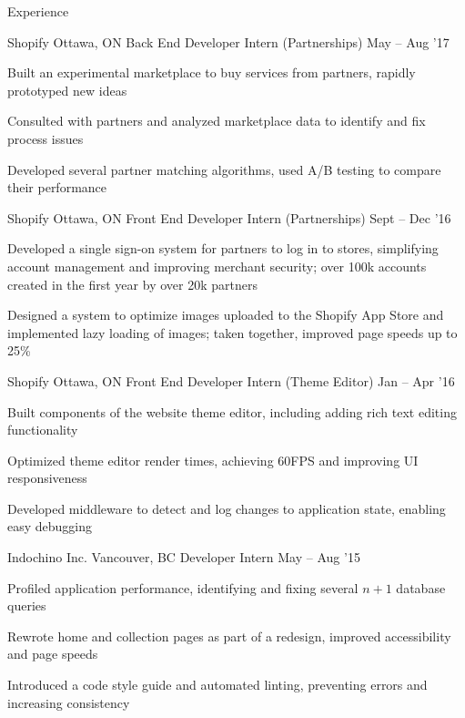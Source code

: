 \documentclass{resume} %
\begin{document}
\begin{rSection}{Experience}
  \begin{rSubsection}{Shopify}
                     {Ottawa, ON}
                     {Back End Developer Intern (Partnerships)}
                     {May -- Aug '17}
    \item Built an experimental marketplace to buy services from partners, rapidly prototyped new ideas
    \item Consulted with partners and analyzed marketplace data to identify and fix process issues
    \item Developed several partner matching algorithms, used A/B testing to compare their performance
  \end{rSubsection}

  \begin{rSubsection}{Shopify}
                     {Ottawa, ON}
                     {Front End Developer Intern (Partnerships)}
                     {Sept -- Dec '16}
    \item Developed a single sign-on system for partners to log in to stores, simplifying account management and improving merchant security; over 100k accounts created in the first year by over 20k partners
    \item Designed a system to optimize images uploaded to the Shopify App Store and implemented lazy loading of images; taken together, improved page speeds up to 25\%
  \end{rSubsection}

  \begin{rSubsection}{Shopify}
                     {Ottawa, ON}
                     {Front End Developer Intern (Theme Editor)}
                     {Jan -- Apr '16}
    \item Built components of the website theme editor, including adding rich text editing functionality
    \item Optimized theme editor render times, achieving 60FPS and improving UI responsiveness
    \item Developed middleware to detect and log changes to application state, enabling easy debugging
  \end{rSubsection}

  \begin{rSubsection}{Indochino Inc.}
                     {Vancouver, BC}
                     {Developer Intern}
                     {May -- Aug '15}
    \item Profiled application performance, identifying and fixing several $n+1$ database queries
    \item Rewrote home and collection pages as part of a redesign, improved accessibility and page speeds
    \item Introduced a code style guide and automated linting, preventing errors and increasing consistency
  \end{rSubsection}


\end{rSection}
\end{document}
